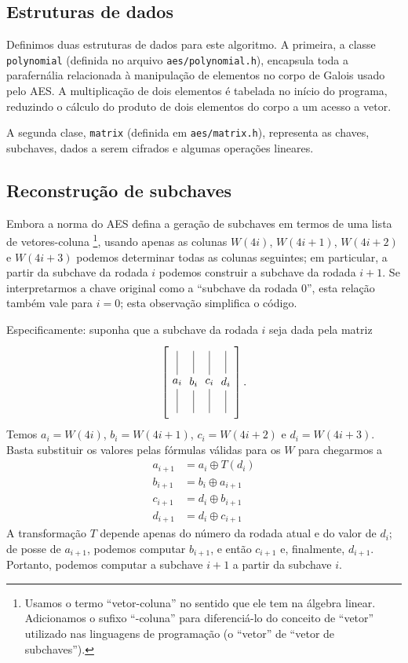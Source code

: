 \documentclass{article}
\newcommand{\xor}{\oplus}
\newcommand{\colvec}[1]{
    \tikz[baseline=-3pt]{
        \node (center) at (0, 0) {$#1$};
        \draw (center) -- (0, 1) (0, 1.2);
        \draw (center) -- (0, -1) (0, -1.2);
    }
}
\begin{document}
\subsection{Estruturas de dados}

Definimos duas estruturas de dados para este algoritmo.
A primeira,
a classe \verb"polynomial"
(definida no arquivo \verb"aes/polynomial.h"),
encapsula toda a parafernália relacionada
à manipulação de elementos no corpo de Galois usado pelo AES.
A multiplicação de dois elementos é tabelada no início do programa,
reduzindo o cálculo do produto de dois elementos do corpo
a um acesso a vetor.

A segunda clase,
\verb"matrix" (definida em \verb"aes/matrix.h"),
representa as chaves, subchaves, dados a serem cifrados
e algumas operações lineares.

\subsection{Reconstrução de subchaves}

Embora a norma do AES defina a geração de subchaves em termos de
uma lista de vetores-coluna%
\footnote{
    Usamos o termo ``vetor-coluna'' no sentido que ele tem na álgebra linear.
    Adicionamos o sufixo ``-coluna'' para diferenciá-lo
    do conceito de ``vetor'' utilizado nas linguagens de programação
    (o ``vetor'' de ``vetor de subchaves'').
},
usando apenas as colunas $W(4i)$, $W(4i+1)$, $W(4i+2)$ e $W(4i+3)$
podemos determinar todas as colunas seguintes;
em particular,
a partir da subchave da rodada $i$
podemos construir a subchave da rodada $i+1$.
Se interpretarmos a chave original como a ``subchave da rodada $0$'',
esta relação também vale para $i = 0$;
esta observação simplifica o código.

Especificamente: suponha que a subchave da rodada $i$
seja dada pela matriz
\begin{equation*}
    \left[ \colvec{a_i} \colvec{b_i} \colvec{c_i} \colvec{d_i} \right].
\end{equation*}
Temos $a_i = W(4i)$, $b_i = W(4i+1)$, $c_i = W(4i+2)$ e $d_i = W(4i+3)$.
Basta substituir os valores pelas fórmulas válidas para os $W$
para chegarmos a
\begin{align*}
    a_{i+1} &= a_i \xor T(d_i) \\
    b_{i+1} &= b_i \xor a_{i+1} \\
    c_{i+1} &= d_i \xor b_{i+1} \\
    d_{i+1} &= d_i \xor c_{i+1}
\end{align*}
A transformação $T$ depende apenas do número da rodada atual e do valor de $d_i$;
de posse de $a_{i+1}$, podemos computar $b_{i+1}$,
e então $c_{i+1}$
e, finalmente, $d_{i+1}$.
Portanto, podemos computar a subchave $i+1$ a partir da subchave $i$.
\end{document}
